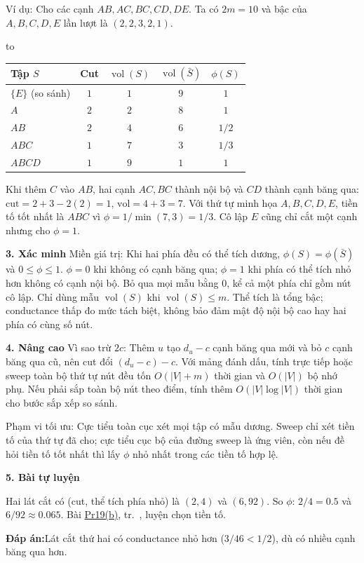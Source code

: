 \documentclass[10pt,a4paper,twocolumn]{article}
\newcommand{\key}[1]{#1:\enspace}
\newcommand{\blocklabel}[1]{\par\noindent#1\par\nobreak}
\newcommand{\finalanswer}[1]{%
  \par\addvspace{3pt}\noindent\textbf{Đáp án:}\nobreak\enspace#1\par}
\newcommand{\evidenceheading}[1]{\blocklabel{\textbf{5. #1}}}
\newcommand{\qlink}[2]{\hyperref[question:#1]{#2}}
\newenvironment{examtable}[1]{%
  \par\addvspace{2pt}\noindent\hbox to \linewidth\bgroup\hfil
  \setlength{\tabcolsep}{4pt}%
  \renewcommand{\arraystretch}{1.12}\begin{tabular}{#1}%
}{\end{tabular}\hfil\egroup\par\addvspace{2pt}}
\newcommand{\unitheading}[2]{%
  \par\addvspace{1pt}\noindent\textbf{#1. #2}\enspace}
\newcommand{\unitverification}{\unitheading{3}{Xác minh}}
\newcommand{\unitadvanced}{\unitheading{4}{Nâng cao}}
\begin{document}
\begin{samepage}
\key{Ví dụ} Cho các cạnh $AB,AC,BC,CD,DE$. Ta có $2m=10$ và bậc của $A,B,C,D,E$ lần lượt là $(2,2,3,2,1)$.\par\nopagebreak
\begin{examtable}{@{}lcccc@{}}
\toprule
Tập $S$ & Cut & $\operatorname{vol}(S)$ & $\operatorname{vol}(\bar S)$ & $\phi(S)$ \\
\midrule
$\{E\}$ (so sánh) & $1$ & $1$ & $9$ & $1$ \\
$A$ & $2$ & $2$ & $8$ & $1$ \\
$AB$ & $2$ & $4$ & $6$ & $1/2$ \\
$ABC$ & $1$ & $7$ & $3$ & $1/3$ \\
$ABCD$ & $1$ & $9$ & $1$ & $1$ \\
\bottomrule
\end{examtable}
\end{samepage}
Khi thêm $C$ vào $AB$, hai cạnh $AC,BC$ thành nội bộ và $CD$ thành cạnh băng qua: $\mathrm{cut}=2+3-2(2)=1$, $\mathrm{vol}=4+3=7$. Với thứ tự minh họa $A,B,C,D,E$, tiền tố tốt nhất là $ABC$ vì $\phi=1/\min(7,3)=1/3$. Cô lập $E$ cũng chỉ cắt một cạnh nhưng cho $\phi=1$.

\unitverification
\key{Miền giá trị} Khi hai phía đều có thể tích dương, $\phi(S)=\phi(\bar S)$ và $0\le\phi\le1$. $\phi=0$ khi không có cạnh băng qua; $\phi=1$ khi phía có thể tích nhỏ hơn không có cạnh nội bộ. Bỏ qua mọi mẫu bằng $0$, kể cả một phía chỉ gồm nút cô lập. Chỉ dùng mẫu $\operatorname{vol}(S)$ khi $\operatorname{vol}(S)\le m$. Thể tích là tổng bậc; conductance thấp đo mức tách biệt, không bảo đảm mật độ nội bộ cao hay hai phía có cùng số nút.

\unitadvanced
\key{Vì sao trừ $2c$} Thêm $u$ tạo $d_u-c$ cạnh băng qua mới và bỏ $c$ cạnh băng qua cũ, nên cut đổi $(d_u-c)-c$. Với mảng đánh dấu, tính trực tiếp hoặc sweep toàn bộ thứ tự nút đều tốn $O(|V|+m)$ thời gian và $O(|V|)$ bộ nhớ phụ. Nếu phải sắp toàn bộ nút theo điểm, tính thêm $O(|V|\log |V|)$ thời gian cho bước sắp xếp so sánh.

\key{Phạm vi tối ưu} Cực tiểu toàn cục xét mọi tập có mẫu dương. Sweep chỉ xét tiền tố của thứ tự đã cho; cực tiểu cục bộ của đường sweep là ứng viên, còn nếu đề hỏi tiền tố tốt nhất thì lấy $\phi$ nhỏ nhất trong các tiền tố hợp lệ.

\evidenceheading{Bài tự luyện}
Hai lát cắt có (cut, thể tích phía nhỏ) là $(2,4)$ và $(6,92)$. So $\phi$: $2/4=0.5$ và $6/92\approx0.065$. Bài \qlink{Pr19}{Pr19(b)}, tr.~\pageref*{question:Pr19}, luyện chọn tiền tố.
\finalanswer{Lát cắt thứ hai có conductance nhỏ hơn ($3/46<1/2$), dù có nhiều cạnh băng qua hơn.}
\end{document}
